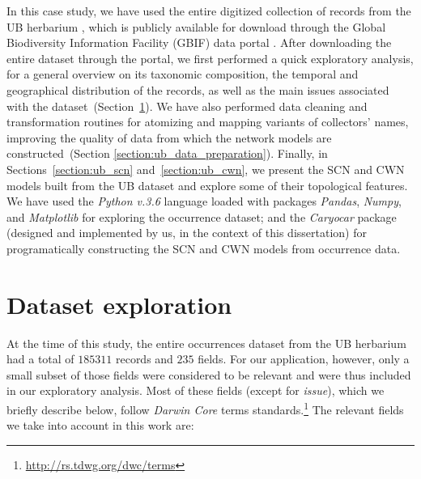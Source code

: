 In this case study, we have used the entire digitized collection of records from the UB herbarium \cite{gbif_ubdataset}, which is publicly available for download through the Global Biodiversity Information Facility (GBIF) data portal \cite{gbif}. 
After downloading the entire dataset through the portal, we first performed a quick exploratory analysis, for a general overview on its taxonomic composition, the temporal and geographical distribution of the records, as well as the main issues associated with the dataset~(Section~\ref{section:ub_exploration}).
We have also performed data cleaning and transformation routines for atomizing and mapping variants of collectors' names, improving the quality of data from which the network models are constructed~(Section \ref{section:ub_data_preparation}).
Finally, in Sections~\ref{section:ub_scn} and~\ref{section:ub_cwn}, we present the SCN and CWN models built from the UB dataset and explore some of their topological features. 
%
We have used the \textit{Python v.3.6} language loaded with packages \textit{Pandas}, \textit{Numpy}, and \textit{Matplotlib} for exploring the occurrence dataset; and the \textit{Caryocar} package (designed and implemented by us, in the context of this dissertation) for programatically constructing the SCN and CWN models from occurrence data.


\section{Dataset exploration}\label{section:ub_exploration}

At the time of this study, the entire occurrences dataset from the UB herbarium had a total of $185311$ records and $235$ fields.
For our application, however, only a small subset of those fields were considered to be relevant and were thus included in our exploratory analysis.
Most of these fields (except for \textit{issue}), which we briefly describe below, follow \textit{Darwin Core} terms standards.\footnote{\url{http://rs.tdwg.org/dwc/terms}} The relevant fields we take into account in this work are:

